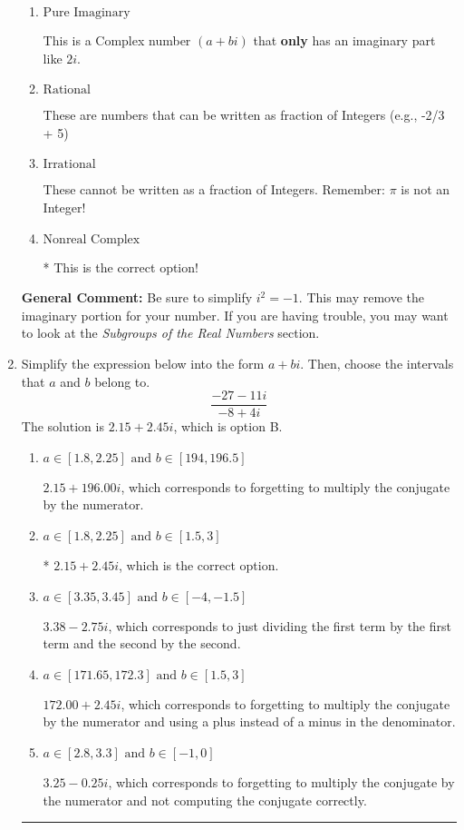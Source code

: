 \documentclass{extbook}[14pt]
\newcommand{\litem}[1]{\item #1

\rule{\textwidth}{0.4pt}}
\begin{document}
\begin{enumerate}
{\begin{enumerate}[label=\Alph*.]
This is not a number. The only non-Complex number we know is dividing by 0 as this is not a number!
\item \( \text{Pure Imaginary} \)

This is a Complex number $(a+bi)$ that \textbf{only} has an imaginary part like $2i$.
\item \( \text{Rational} \)

These are numbers that can be written as fraction of Integers (e.g., -2/3 + 5)
\item \( \text{Irrational} \)

These cannot be written as a fraction of Integers. Remember: $\pi$ is not an Integer!
\item \( \text{Nonreal Complex} \)

* This is the correct option!
\end{enumerate}

\textbf{General Comment:} Be sure to simplify $i^2 = -1$. This may remove the imaginary portion for your number. If you are having trouble, you may want to look at the \textit{Subgroups of the Real Numbers} section.
}
\litem{
Simplify the expression below into the form $a+bi$. Then, choose the intervals that $a$ and $b$ belong to.
\[ \frac{-27 - 11 i}{-8 + 4 i} \]The solution is \( 2.15  + 2.45 i \), which is option B.\begin{enumerate}[label=\Alph*.]
\item \( a \in [1.8, 2.25] \text{ and } b \in [194, 196.5] \)

 $2.15  + 196.00 i$, which corresponds to forgetting to multiply the conjugate by the numerator.
\item \( a \in [1.8, 2.25] \text{ and } b \in [1.5, 3] \)

* $2.15  + 2.45 i$, which is the correct option.
\item \( a \in [3.35, 3.45] \text{ and } b \in [-4, -1.5] \)

 $3.38  - 2.75 i$, which corresponds to just dividing the first term by the first term and the second by the second.
\item \( a \in [171.65, 172.3] \text{ and } b \in [1.5, 3] \)

 $172.00  + 2.45 i$, which corresponds to forgetting to multiply the conjugate by the numerator and using a plus instead of a minus in the denominator.
\item \( a \in [2.8, 3.3] \text{ and } b \in [-1, 0] \)

 $3.25  - 0.25 i$, which corresponds to forgetting to multiply the conjugate by the numerator and not computing the conjugate correctly.
\end{enumerate}

}
\end{enumerate}
\end{document}
